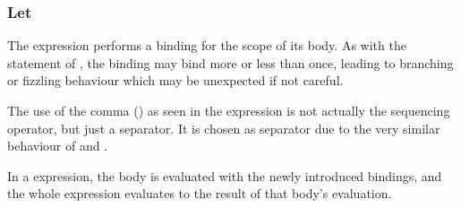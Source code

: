 \subsubsection{Let}

The  expression performs a binding for the scope of its body. As with
the  statement of \Prose{}, the binding may bind more or less than once,
leading to branching or fizzling behaviour which may be unexpected if not careful.

The use of the comma (\op{,}) as seen in the  expression is not actually
the sequencing operator, but just a separator. It is chosen as separator due to the
very similar behaviour of  and .

\begin{bnf*}
\end{bnf*}

In a  expression, the body is evaluated with the newly introduced bindings,
and the whole expression evaluates to the result of that body's evaluation.

\begin{prooftree}
\end{prooftree}
